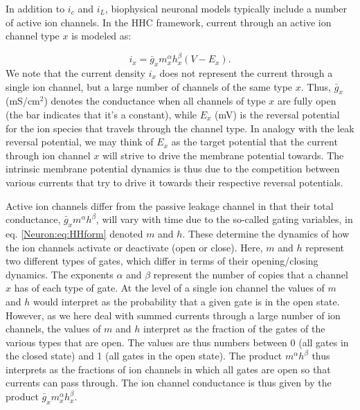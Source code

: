\subsubsection{}
\label{sec:Neuron:active}
In addition to $i_c$ and $i_L$, biophysical neuronal models typically include a number of active ion channels. In the HHC framework, current through an active ion channel type $x$ is modeled as:

\begin{equation}
i_x = \bar{g}_x m_x^{\alpha} h_x^{\beta}(V-E_x).
\label{Neuron:eq:HHform}
\end{equation}
We note that the current density $i_x$ does not represent the current through a single ion channel, but a large number of channels of the same type $x$. Thus, $\bar{g}_x$ (mS/cm$^2$) denotes the conductance when all channels of type $x$ are fully open (the bar indicates that it's a constant), while $E_x$ (mV) is the reversal potential for the ion species that travels through the channel type. In analogy with the leak reversal potential, we may think of $E_x$ as the target potential that the current through ion channel $x$ will strive to drive the membrane potential towards. The intrinsic membrane potential dynamics is thus due to the competition between various currents that try to drive it towards their respective reversal potentials. 

Active ion channels differ from the passive leakage channel in that their total conductance, $\bar{g}_{x} m^{\alpha} h^{\beta}$, will vary with time due to the so-called gating variables, in eq. \ref{Neuron:eq:HHform} denoted $m$ and $h$. These determine the dynamics of how the ion channels activate or deactivate (open or close). Here, $m$ and $h$ represent two different types of gates, which differ in terms of their opening/closing dynamics. The exponents $\alpha$ and $\beta$ represent the number of copies that a channel $x$ has of each type of gate. At the level of a single ion channel the values of $m$ and $h$ would interpret as the probability that a given gate is in the open state. However, as we here deal with summed currents through a large number of ion channels, the values of $m$ and $h$ interpret as the fraction of the gates of the various types that are open. The values are thus numbers between 0 (all gates in the closed state) and 1 (all gates in the open state). The product $m^{\alpha} h^{\beta}$ thus interprets as the fractions of ion channels in which all gates are open so that currents can pass through. The ion channel conductance is thus given by the product $\bar{g}_x m_x^{\alpha} h_x^{\beta}$.

